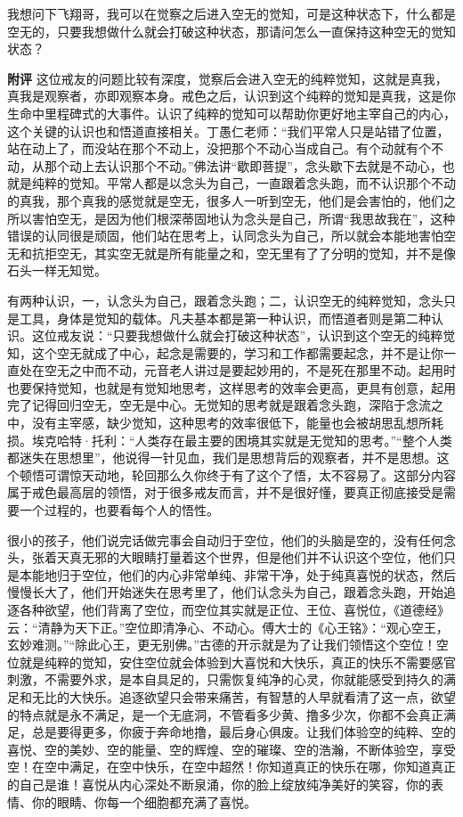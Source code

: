 \begin{case}
    我想问下飞翔哥，我可以在觉察之后进入空无的觉知，可是这种状态下，什么都是空无的，只要我想做什么就会打破这种状态，那请问怎么一直保持这种空无的觉知状态？

    \textbf{附评} 这位戒友的问题比较有深度，觉察后会进入空无的纯粹觉知，这就是真我，真我是观察者，亦即观察本身。戒色之后，认识到这个纯粹的觉知是真我，这是你生命中里程碑式的大事件。认识了纯粹的觉知可以帮助你更好地主宰自己的内心，这个关键的认识也和悟道直接相关。丁愚仁老师：“我们平常人只是站错了位置，站在动上了，而没站在那个不动上，没把那个不动心当成自己。有个动就有个不动，从那个动上去认识那个不动。”佛法讲“歇即菩提”，念头歇下去就是不动心，也就是纯粹的觉知。平常人都是以念头为自己，一直跟着念头跑，而不认识那个不动的真我，那个真我的感觉就是空无，很多人一听到空无，他们是会害怕的，他们之所以害怕空无，是因为他们根深蒂固地认为念头是自己，所谓“我思故我在”，这种错误的认同很是顽固，他们站在思考上，认同念头为自己，所以就会本能地害怕空无和抗拒空无，其实空无就是所有能量之和，空无里有了了分明的觉知，并不是像石头一样无知觉。

    有两种认识，一，认念头为自己，跟着念头跑；二，认识空无的纯粹觉知，念头只是工具，身体是觉知的载体。凡夫基本都是第一种认识，而悟道者则是第二种认识。这位戒友说：“只要我想做什么就会打破这种状态”，认识到这个空无的纯粹觉知，这个空无就成了中心，起念是需要的，学习和工作都需要起念，并不是让你一直处在空无之中而不动，元音老人讲过是要起妙用的，不是死在那里不动。起用时也要保持觉知，也就是有觉知地思考，这样思考的效率会更高，更具有创意，起用完了记得回归空无，空无是中心。无觉知的思考就是跟着念头跑，深陷于念流之中，没有主宰感，缺少觉知，这种思考的效率很低下，能量也会被胡思乱想所耗损。埃克哈特·托利：“人类存在最主要的困境其实就是无觉知的思考。”“整个人类都迷失在思想里”，他说得一针见血，我们是思想背后的观察者，并不是思想。这个顿悟可谓惊天动地，轮回那么久你终于有了这个了悟，太不容易了。这部分内容属于戒色最高层的领悟，对于很多戒友而言，并不是很好懂，要真正彻底接受是需要一个过程的，也要看每个人的悟性。

    很小的孩子，他们说完话做完事会自动归于空位，他们的头脑是空的，没有任何念头，张着天真无邪的大眼睛打量着这个世界，但是他们并不认识这个空位，他们只是本能地归于空位，他们的内心非常单纯、非常干净，处于纯真喜悦的状态，然后慢慢长大了，他们开始迷失在思考里了，他们认念头为自己，跟着念头跑，开始追逐各种欲望，他们背离了空位，而空位其实就是正位、王位、喜悦位，《道德经》云：“清静为天下正。”空位即清净心、不动心。傅大士的《心王铭》：“观心空王，玄妙难测。”“除此心王，更无别佛。”古德的开示就是为了让我们领悟这个空位！空位就是纯粹的觉知，安住空位就会体验到大喜悦和大快乐，真正的快乐不需要感官刺激，不需要外求，是本自具足的，只需恢复纯净的心灵，你就能感受到持久的满足和无比的大快乐。追逐欲望只会带来痛苦，有智慧的人早就看清了这一点，欲望的特点就是永不满足，是一个无底洞，不管看多少黄、撸多少次，你都不会真正满足，总是要得更多，你疲于奔命地撸，最后身心俱废。让我们体验空的纯粹、空的喜悦、空的美妙、空的能量、空的辉煌、空的璀璨、空的浩瀚，不断体验空，享受空！在空中满足，在空中快乐，在空中超然！你知道真正的快乐在哪，你知道真正的自己是谁！喜悦从内心深处不断泉涌，你的脸上绽放纯净美好的笑容，你的表情、你的眼睛、你每一个细胞都充满了喜悦。
\end{case}

